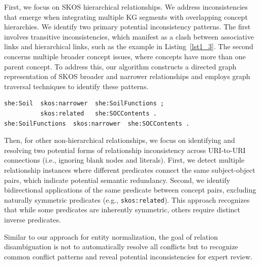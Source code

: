 \documentclass[preprint,12pt]{elsarticle}
\begin{document}
First, we focus on SKOS hierarchical relationships. We address inconsistencies that emerge when integrating multiple KG segments with overlapping concept hierarchies. We identify two primary potential inconsistency patterns. The first involves transitive inconsistencies, which manifest as a clash between associative links and hierarchical links, such as the example in Listing~\ref{lst1_3}. The second concerns multiple broader concept issues, where concepts have more than one parent concept.
To address this, our algorithm constructs a directed graph representation of SKOS broader and narrower relationships and employs graph traversal techniques to identify these patterns.

\begin{lstlisting}[style=TurtleStyle, caption={Example of inconsistent hierarchical relationships.}, label={lst1_3}]
she:Soil  skos:narrower  she:SoilFunctions ;
          skos:related   she:SOCContents .
she:SoilFunctions  skos:narrower  she:SOCContents .
\end{lstlisting}

Then, for other non-hierarchical relationships, we focus on identifying and resolving two potential forms of relationship inconsistency across URI-to-URI connections (i.e., ignoring blank nodes and literals). First, we detect multiple relationship instances where different predicates connect the same subject-object pairs, which indicate potential semantic redundancy. Second, we identify bidirectional applications of the same predicate between concept pairs, excluding naturally symmetric predicates (e.g., \texttt{skos:related}). This approach recognizes that while some predicates are inherently symmetric, others require distinct inverse predicates.

Similar to our approach for entity normalization, the goal of relation disambiguation is not to automatically resolve all conflicts but to recognize common conflict patterns and reveal potential inconsistencies for expert review.
\end{document}
